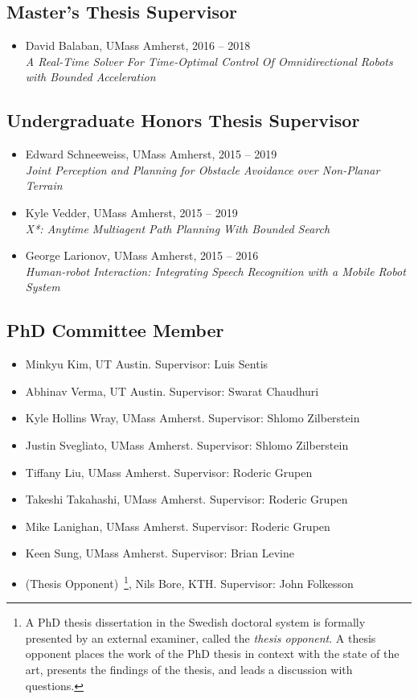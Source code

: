 \documentclass[Times]{article}
\begin{document}
\subsection*{Master's Thesis Supervisor}
\begin{itemize}
 \item David Balaban, UMass Amherst, 2016 -- 2018\\
 \emph{A Real-Time Solver For Time-Optimal Control Of Omnidirectional Robots with Bounded Acceleration}
\end{itemize}

\subsection*{Undergraduate Honors Thesis Supervisor}
\begin{itemize}
 \item Edward Schneeweiss, UMass Amherst, 2015 -- 2019\\
  \emph{Joint Perception and Planning for Obstacle Avoidance over Non-Planar Terrain}
 \item Kyle Vedder, UMass Amherst, 2015 -- 2019\\
  \emph{X*: Anytime Multiagent Path Planning With Bounded Search}
 \item George Larionov, UMass Amherst, 2015 -- 2016\\
  \emph{Human-robot Interaction: Integrating Speech Recognition with a Mobile Robot System}
\end{itemize}

\subsection*{PhD Committee Member}
\begin{itemize}
  \item Minkyu Kim, UT Austin. Supervisor: Luis Sentis
  \item Abhinav Verma, UT Austin. Supervisor: Swarat Chaudhuri
  \item Kyle Hollins Wray, UMass Amherst. Supervisor: Shlomo Zilberstein
  \item Justin Svegliato, UMass Amherst. Supervisor: Shlomo Zilberstein
  \item Tiffany Liu, UMass Amherst. Supervisor: Roderic Grupen
  \item Takeshi Takahashi, UMass Amherst. Supervisor: Roderic Grupen
  \item Mike Lanighan, UMass Amherst. Supervisor: Roderic Grupen
  \item Keen Sung, UMass Amherst. Supervisor: Brian Levine
  \item (Thesis Opponent)~\footnote{A PhD thesis dissertation in the Swedish
  doctoral system
is formally presented by an external examiner, called the \emph{thesis
opponent}. A thesis opponent places the work of the PhD thesis in context with
the state of the art, presents the findings of the thesis, and leads a
discussion with questions.}, Nils Bore, KTH. Supervisor: John Folkesson
\end{itemize}
\end{document}
